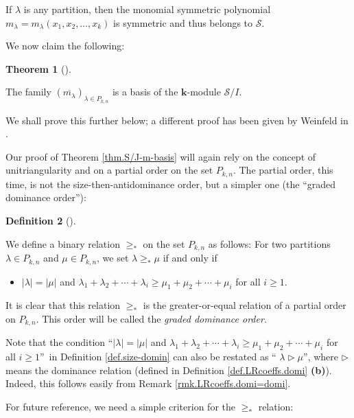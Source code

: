 \documentclass[numbers=enddot,12pt,final,onecolumn,notitlepage]{scrartcl}%
\theoremstyle{definition}
\newtheorem{theo}{Theorem}[section]
\newenvironment{theorem}[1][]
{\begin{theo}[#1]\begin{leftbar}}
{\end{leftbar}\end{theo}}
\newtheorem{defi}[theo]{Definition}
\newenvironment{definition}[1][]
{\begin{defi}[#1]\begin{leftbar}}
{\end{leftbar}\end{defi}}
\begin{document}
If $\lambda$ is any partition, then the monomial symmetric polynomial
$m_{\lambda}=m_{\lambda}\left(  x_{1},x_{2},\ldots,x_{k}\right)  $ is
symmetric and thus belongs to $\mathcal{S}$.

We now claim the following:

\begin{theorem}
\label{thm.S/J-m-basis}The family $\left(  \overline{m_{\lambda}}\right)
_{\lambda\in P_{k,n}}$ is a basis of the $\mathbf{k}$-module $\mathcal{S}/I$.
\end{theorem}

We shall prove this further below; a different proof has been given by
Weinfeld in \cite[Corollary 6.2]{Weinfe19}.

Our proof of Theorem \ref{thm.S/J-m-basis} will again rely on the concept of
unitriangularity and on a partial order on the set $P_{k,n}$. The partial
order, this time, is not the size-then-antidominance order, but a simpler one
(the \textquotedblleft graded dominance order\textquotedblright):

\begin{definition}
\label{def.size-domin}We define a binary relation $\geq_{\ast}$ on the set
$P_{k,n}$ as follows: For two partitions $\lambda\in P_{k,n}$ and $\mu\in
P_{k,n}$, we set $\lambda\geq_{\ast}\mu$ if and only if

\begin{itemize}
\item $\left\vert \lambda\right\vert =\left\vert \mu\right\vert $ and
$\lambda_{1}+\lambda_{2}+\cdots+\lambda_{i}\geq\mu_{1}+\mu_{2}+\cdots+\mu_{i}$
for all $i\geq1$.
\end{itemize}

It is clear that this relation $\geq_{\ast}$ is the greater-or-equal relation
of a partial order on $P_{k,n}$. This order will be called the \textit{graded
dominance order}.
\end{definition}

Note that the condition \textquotedblleft$\left\vert \lambda\right\vert
=\left\vert \mu\right\vert $ and $\lambda_{1}+\lambda_{2}+\cdots+\lambda
_{i}\geq\mu_{1}+\mu_{2}+\cdots+\mu_{i}$ for all $i\geq1$\textquotedblright\ in
Definition \ref{def.size-domin} can also be restated as \textquotedblleft%
$\lambda\triangleright\mu$\textquotedblright, where $\triangleright$ means the
dominance relation (defined in Definition \ref{def.LRcoeffs.domi}
\textbf{(b)}). Indeed, this follows easily from Remark
\ref{rmk.LRcoeffs.domi=domi}.

For future reference, we need a simple criterion for the $\geq_{\ast}$ relation:
\end{document}
